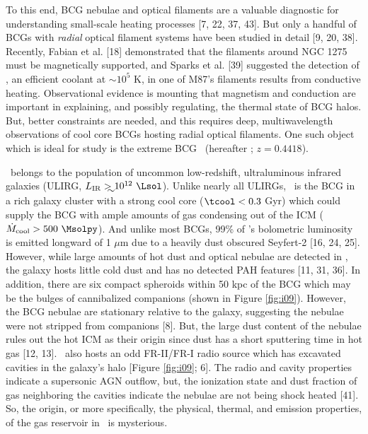\documentclass[11pt]{article}
\begin{document}
To this end, BCG nebulae and optical filaments are a valuable
diagnostic for understanding small-scale heating processes [7, 22, 37,
  43]. But only a handful of BCGs with {\it{radial}} optical filament
systems have been studied in detail [9, 20, 38]. Recently, Fabian et
al. [18] demonstrated that the filaments around NGC 1275 must be
magnetically supported, and Sparks et al. [39] suggested the detection
of \civ, an efficient coolant at $\sim 10^{5}$ K, in one of M87's
filaments results from conductive heating. Observational evidence is
mounting that magnetism and conduction are important in explaining,
and possibly regulating, the thermal state of BCG halos. But, better
constraints are needed, and this requires deep, multiwavelength
observations of cool core BCGs hosting radial optical filaments. One
such object which is ideal for study is the extreme BCG
\iras\ (hereafter \irs; $z=0.4418$).

\irs\ belongs to the population of uncommon low-redshift,
ultraluminous infrared galaxies (ULIRG, $L_{\mathrm{IR}} \ga 10^{12}
~\Lsol$). Unlike nearly all ULIRGs, \irs\ is the BCG in a rich galaxy
cluster with a strong cool core ($\tcool < 0.3$ Gyr) which could
supply the BCG with ample amounts of gas condensing out of the ICM
($\dot{M}_{\mathrm{cool}} > 500 ~\Msolpy$). And unlike most BCGs, 99\%
of \irs's bolometric luminosity is emitted longward of 1 $\mu$m due to
a heavily dust obscured Seyfert-2 [16, 24, 25]. However, while large
amounts of hot dust and optical nebulae are detected in \irs, the
galaxy hosts little cold dust and has no detected PAH features [11,
  31, 36]. In addition, there are six compact spheroids within 50 kpc
of the BCG which may be the bulges of cannibalized companions (shown
in Figure \ref{fig:i09}). However, the BCG nebulae are stationary
relative to the galaxy, suggesting the nebulae were not stripped from
companions [8]. But, the large dust content of the nebulae rules out
the hot ICM as their origin since dust has a short sputtering time in
hot gas [12, 13]. \irs\ also hosts an odd FR-II/FR-I radio source
which has excavated cavities in the galaxy's halo [Figure
  \ref{fig:i09}; 6]. The radio and cavity properties indicate a
supersonic AGN outflow, but, the ionization state and dust fraction of
gas neighboring the cavities indicate the nebulae are not being shock
heated [41]. So, the origin, or more specifically, the physical,
thermal, and emission properties, of the gas reservoir in \irs\ is
mysterious.
\end{document}
